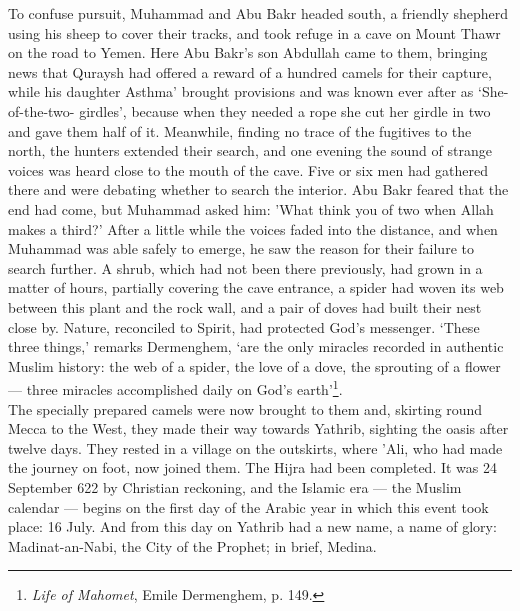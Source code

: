 \documentclass[10pt, twoside]{book}
\begin{document}
To confuse pursuit, Muhammad and Abu Bakr headed south, a friendly shepherd using his sheep to cover 
their tracks, and took refuge in a cave on Mount Thawr on the road to Yemen. Here Abu Bakr's son 
Abdullah came to them, bringing news that Quraysh had offered a reward of a hundred camels for their 
capture, while his daughter Asthma' brought provisions and was known ever after as `She\hyp{}of\hyp{}the\hyp{}two\hyp{}
girdles', because when they needed a rope she cut her girdle in two and gave them half of it. 
Meanwhile, finding no trace of the fugitives to the north, the hunters extended their search, and one 
evening the sound of strange voices was heard close to the mouth of the cave. Five or six men had 
gathered there and were debating whether to search the interior. Abu Bakr feared that the end had 
come, but Muhammad asked him: 'What think you of two when Allah makes a third?' After a little while 
the voices faded into the distance, and when Muhammad was able safely to emerge, he saw the reason 
for their failure to search further. A shrub, which had not been there previously, had grown in a 
matter of hours, partially covering the cave entrance, a spider had woven its web between this plant 
and the rock wall, and a pair of doves had built their nest close by. Nature, reconciled to Spirit, 
had protected God's messenger. `These three things,' remarks Dermenghem, `are the only miracles 
recorded in authentic Muslim history: the web of a spider, the love of a dove, the sprouting of a 
flower --- three miracles accomplished daily on God's earth'\footnote{\emph{Life of Mahomet}, Emile Dermenghem, p. 149.}. \\

The specially prepared camels were now brought to them and, skirting round Mecca to the West, they 
made their way towards Yathrib, sighting the oasis after twelve days. They rested in a village on the 
outskirts, where 'Ali, who had made the journey on foot, now joined them. The Hijra had been 
completed. It was 24 September 622 by Christian reckoning, and the Islamic era --- the Muslim calendar 
--- begins on the first day of the Arabic year in which this event took place: 16 July. And from this 
day on Yathrib had a new name, a name of glory: Madinat\hyp{}an\hyp{}Nabi, the City of the Prophet; in brief, 
Medina. \\
\end{document}
